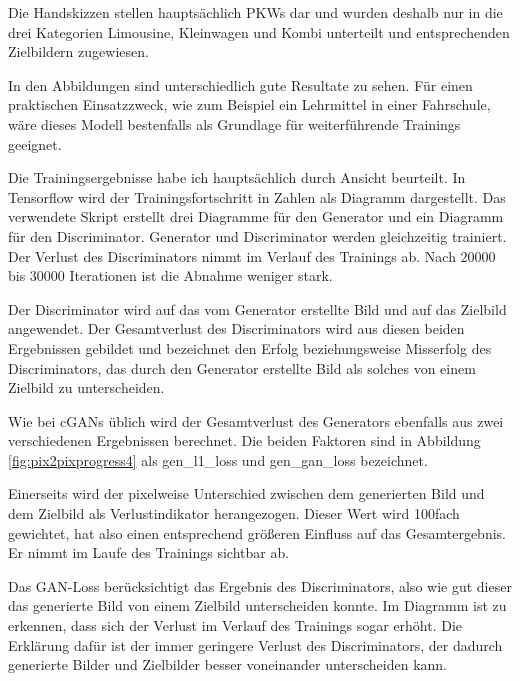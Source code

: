 Die Handskizzen stellen hauptsächlich PKWs dar und wurden deshalb nur in die drei Kategorien Limousine, Kleinwagen und Kombi unterteilt und entsprechenden Zielbildern zugewiesen.

In den Abbildungen sind unterschiedlich gute Resultate zu sehen. Für einen praktischen Einsatzzweck, wie zum Beispiel ein Lehrmittel in einer Fahrschule, wäre dieses Modell bestenfalls als Grundlage für weiterführende Trainings geeignet.

Die Trainingsergebnisse habe ich hauptsächlich durch Ansicht beurteilt. In Tensorflow wird der Trainingsfortschritt in Zahlen als Diagramm dargestellt. Das verwendete Skript erstellt drei Diagramme für den Generator und ein Diagramm für den Discriminator. Generator und Discriminator werden gleichzeitig trainiert. Der Verlust des Discriminators nimmt im Verlauf des Trainings ab. Nach $20000$ bis $30000$ Iterationen ist die Abnahme weniger stark.

Der Discriminator wird auf das vom Generator erstellte Bild und auf das Zielbild angewendet. Der Gesamtverlust des Discriminators wird aus diesen beiden Ergebnissen gebildet und bezeichnet den Erfolg beziehungsweise Misserfolg des Discriminators, das durch den Generator erstellte Bild als solches von einem Zielbild zu unterscheiden.

Wie bei cGANs üblich wird der Gesamtverlust des Generators ebenfalls aus zwei verschiedenen Ergebnissen berechnet. Die beiden Faktoren sind in Abbildung \ref{fig:pix2pixprogress4} als gen\_l1\_loss und gen\_gan\_loss bezeichnet.

Einerseits wird der pixelweise Unterschied zwischen dem generierten Bild und dem Zielbild als Verlustindikator herangezogen. Dieser Wert wird 100fach gewichtet, hat also einen entsprechend größeren Einfluss auf das Gesamtergebnis. Er nimmt im Laufe des Trainings sichtbar ab.

Das GAN-Loss berücksichtigt das Ergebnis des Discriminators, also wie gut dieser das generierte Bild von einem Zielbild unterscheiden konnte. Im Diagramm ist zu erkennen, dass sich der Verlust im Verlauf des Trainings sogar erhöht. Die Erklärung dafür ist der immer geringere Verlust des Discriminators, der dadurch generierte Bilder und Zielbilder besser voneinander unterscheiden kann.

